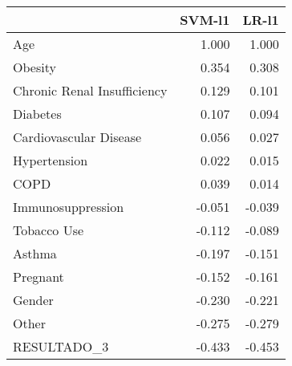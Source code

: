 \begin{tabular}{lrr}
\toprule
{} &  SVM-l1 &  LR-l1 \\
\midrule
Age                         &   1.000 &  1.000 \\
Obesity                     &   0.354 &  0.308 \\
Chronic Renal Insufficiency &   0.129 &  0.101 \\
Diabetes                    &   0.107 &  0.094 \\
Cardiovascular Disease      &   0.056 &  0.027 \\
Hypertension                &   0.022 &  0.015 \\
COPD                        &   0.039 &  0.014 \\
Immunosuppression           &  -0.051 & -0.039 \\
Tobacco Use                 &  -0.112 & -0.089 \\
Asthma                      &  -0.197 & -0.151 \\
Pregnant                    &  -0.152 & -0.161 \\
Gender                      &  -0.230 & -0.221 \\
Other                       &  -0.275 & -0.279 \\
RESULTADO\_3                 &  -0.433 & -0.453 \\
\bottomrule
\end{tabular}
